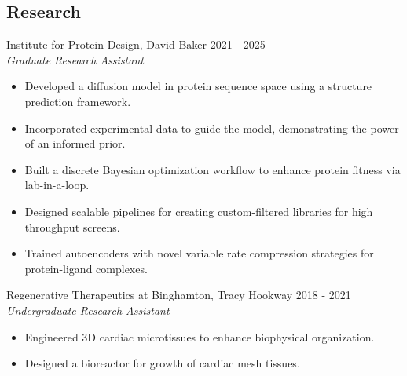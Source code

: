\documentclass[letter]{res}
\begin{document}
\begin{resume}
\section{Research}
Institute for Protein Design, David Baker \hfill 2021 - 2025\\
{\sl Graduate Research Assistant}\\
 \vspace{-2mm}
 \begin{itemize}
 \item  Developed a diffusion model in protein sequence space using a structure prediction framework.
 \item Incorporated experimental data to guide the model, demonstrating the power of an informed prior.
 \item Built a discrete Bayesian optimization workflow to enhance protein fitness via lab-in-a-loop.
 \item Designed scalable pipelines for creating custom-filtered libraries for high throughput screens.
 \item Trained autoencoders with novel variable rate compression strategies for protein-ligand complexes.
 \end{itemize}



Regenerative Therapeutics at Binghamton, Tracy Hookway \hfill 2018 - 2021\\
{\sl Undergraduate Research Assistant}\\
 \vspace{-2mm}
 \begin{itemize}
 \item Engineered 3D cardiac microtissues to enhance biophysical organization.
 \item Designed a bioreactor for growth of cardiac mesh tissues.
 \end{itemize}
   \vspace{-2mm}



\end{resume}
\end{document}
